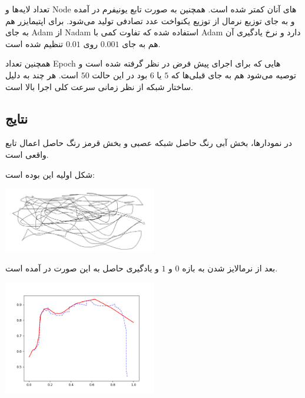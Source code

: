 \documentclass[12pt,titlepage,a4page , tikz , multi,table , svgnames,xcdraw]{article}
\begin{document}
تعداد لایه‌ها و Node های آنان کمتر شده است. همچنین  به صورت تابع یونیفرم در آمده و به جای توزیع نرمال از توزیع یکنواخت عدد تصادفی تولید می‌شود. برای اپتیمایزر هم به جای Adam از Nadam استفاده شده که تفاوت کمی با Adam دارد و نرخ یادگیری آن هم به جای $0.001$ روی $0.01$ تنظیم شده است.

همچنین تعداد Epoch هایی که برای اجرای پیش فرض در نظر گرفته شده است و توصیه می‌شود هم به جای قبلی‌ها که $5$ یا $6$ بود در این حالت $50$ است. هر چند به دلیل ساختار شبکه از نظر زمانی سرعت کلی اجرا بالا است.





\newpage

\subsection{نتایج}

در نمودارها، بخش آبی رنگ حاصل شبکه عصبی و بخش قرمز رنگ حاصل اعمال تابع واقعی است.


شکل اولیه این بوده است:



\begin{center}

 \includegraphics[width=0.5\textwidth]{pictures/16.png}

\end{center}

بعد از نرمالایز شدن به بازه $0$ و $1$ و یادگیری حاصل به این صورت در آمده است. 


\begin{center}

 \includegraphics[width=0.5\textwidth]{pictures/15.png}

\end{center}
\end{document}

